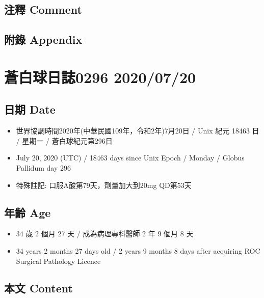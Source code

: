 \documentclass[
]{article}
\providecommand{\tightlist}{%
  \setlength{\itemsep}{0pt}\setlength{\parskip}{0pt}}
\begin{document}
\hypertarget{ux6ce8ux91cb-comment-17}{%
\subsection{注釋 Comment}\label{ux6ce8ux91cb-comment-17}}

\hypertarget{ux9644ux9304-appendix-17}{%
\subsection{附錄 Appendix}\label{ux9644ux9304-appendix-17}}

\hypertarget{ux84bcux767dux7403ux65e5ux8a8c0296-20200720}{%
\section{蒼白球日誌0296
2020/07/20}\label{ux84bcux767dux7403ux65e5ux8a8c0296-20200720}}

\hypertarget{ux65e5ux671f-date-18}{%
\subsection{日期 Date}\label{ux65e5ux671f-date-18}}

\begin{itemize}
\tightlist
\item
  世界協調時間2020年(中華民國109年，令和2年)7月20日 / Unix 紀元 18463 日
  / 星期一 / 蒼白球紀元第296日
\item
  July 20, 2020 (UTC) / 18463 days since Unix Epoch / Monday / Globus
  Pallidum day 296
\item
  特殊註記: 口服A酸第79天，劑量加大到20mg QD第53天
\end{itemize}

\hypertarget{ux5e74ux9f61-age-18}{%
\subsection{年齡 Age}\label{ux5e74ux9f61-age-18}}

\begin{itemize}
\tightlist
\item
  34 歲 2 個月 27 天 / 成為病理專科醫師 2 年 9 個月 8 天
\item
  34 years 2 months 27 days old / 2 years 9 months 8 days after
  acquiring ROC Surgical Pathology Licence
\end{itemize}

\hypertarget{ux672cux6587-content-18}{%
\subsection{本文 Content}\label{ux672cux6587-content-18}}
\end{document}

